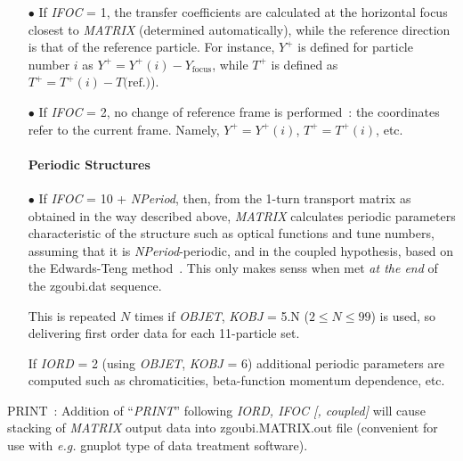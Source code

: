 {\begin{itemize}
\item[$\bullet$] If \textsl{IFOC} = 1, the transfer coefficients are calculated at the 
horizontal focus  closest to \textsl{MATRIX} (determined 
automatically), while the reference direction is that of the reference  particle. For 
instance, $ Y^+ $ is defined for particle number $ i $ as $ Y^+=Y^+(i) -Y_{\text{focus}} $, 
while  $ T^+ $ is defined as $ T^+=T^+(i)-T(\textrm{ref.)}$).  

\item[$\bullet$] If \textsl{IFOC} = 2, no change of reference frame is 
performed~: the coordinates refer to the current frame. Namely, $ Y^+=Y^+(i)$, 
$ T^+=T^+(i)$,  etc. \

\paragraph{\large Periodic Structures} 

\item[$\bullet$] If \textsl{IFOC} = 10  +  \textsl{NPeriod}, then, 
from the 1-turn transport matrix as obtained in the way described above,
 \textsl{MATRIX} calculates periodic parameters characteristic  of the structure 
such as  optical functions and tune numbers, assuming that it is \textsl{NPeriod}-periodic, 
and  in the coupled hypothesis, based on the Edwards-Teng method~\cite{Coupling}. 
This only makes senss when met \textsl{at the end} of the zgoubi.dat sequence. 

This is repeated $N$ times if \textsl{OBJET}, \textsl{KOBJ} = 5.N ($2\leq N \leq 99$) is used, 
so delivering first order data for each 11-particle set.

\smallskip

If  \textsl{IORD} = 2 (using \textsl{OBJET}, \textsl{KOBJ} = 6) additional 
periodic parameters are computed such as chromaticities,  beta-function momentum dependence, 
 etc. 


\end{itemize}

 
\bigskip

\noindent PRINT~: 
  Addition of ``\textsl{PRINT}'' following \textsl{IORD, IFOC [, coupled]} will cause 
stacking of \textsl{MATRIX} output data into   zgoubi.MATRIX.out  
file (convenient for use with \emph{e.g.} gnuplot type of data treatment software). 

\medskip

}
